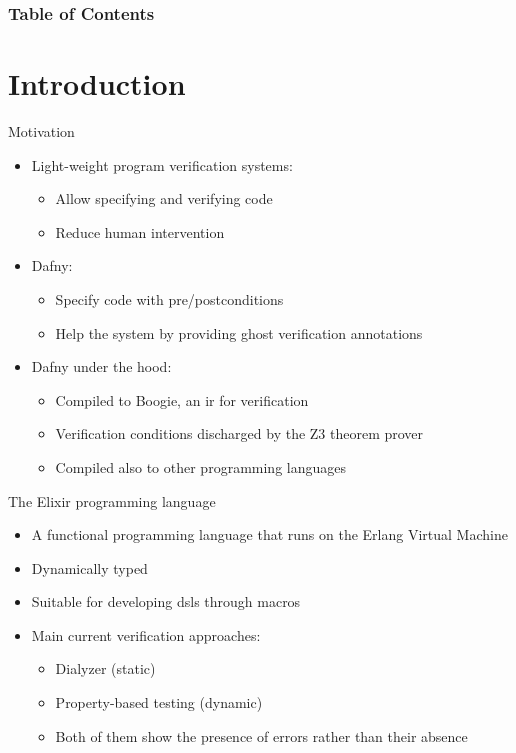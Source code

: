 \documentclass{beamer}
\title{\titulo}
\subtitle{Master's Degree in Formal Methods and Computer Engineering}
\date{July 7, 2022}
\author{\autor \\ Supervisor: Manuel Montenegro Montes}
\institute{Complutense University of Madrid}
\begin{document}
  \maketitle
  \begin{frame}
    \frametitle{Table of Contents}
    \tableofcontents
  \end{frame}
  \section{Introduction}
  \begin{frame}{Motivation}
    \begin{itemize}
      \item \pause Light-weight program verification systems:
      \begin{itemize}
        \item \pause Allow specifying and verifying code
        \item \pause Reduce human intervention
      \end{itemize}
      \item \pause Dafny:
      \begin{itemize}
        \item \pause Specify code with pre/postconditions
        \item \pause Help the system by providing ghost verification annotations
      \end{itemize}
      \item \pause Dafny under the hood:
      \begin{itemize}
        \item \pause Compiled to Boogie, an \gls*{ir} for verification
        \item \pause Verification conditions discharged by the Z3 theorem prover
        \item \pause Compiled also to other programming languages
      \end{itemize}
    \end{itemize}
  \end{frame}
  \begin{frame}{The Elixir programming language}
    \begin{itemize}
      \item \pause A functional programming language that runs on the Erlang Virtual Machine
      \item \pause Dynamically typed
      \item \pause Suitable for developing \gls*{dsl}s through macros
      \item \pause Main current verification approaches:
      \begin{itemize}
        \item \pause Dialyzer (static)
        \item \pause Property-based testing (dynamic)
        \item \pause Both of them show the presence of errors rather than their absence
      \end{itemize}
    \end{itemize}
  \end{frame}
\end{document}
